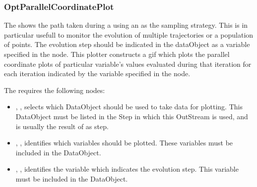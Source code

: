 \subsubsection{OptParallelCoordinatePlot}
The   shows the path taken during a  using
an  as the sampling strategy. This is in particular usefull to monitor the evolution of multiple
trajectories or a population of points.
The evolution step should be indicated in the dataObject as a variable specified in the  node.
This plotter constructs a gif which plots the parallel coordinate plots of particular variable's values evaluated
during that iteration for each iteration indicated by the variable specified in the  node.

The   requires the following nodes:
\begin{itemize}
  \item {}, , selects which DataObject should be used
      to take data for plotting. This DataObject must be listed in the Step in which this
      OutStream is used, and is usually the result of as  step.
  \item {}, , identifies which variables should
      be plotted. These variables must be included in the 
      DataObject.
  \item {}, , identifies the variable which indicates
      the evolution step. This variable must be included in the  DataObject.
\end{itemize}

